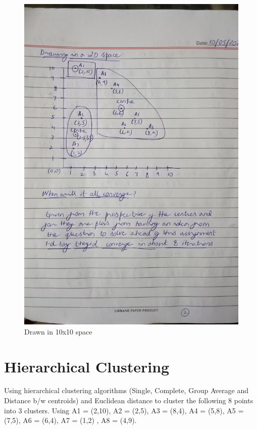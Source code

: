 \documentclass[12pt]{article}
\begin{document}
\begin{figure}
  \includegraphics[width=\linewidth]{2.jpg}
  \caption{Drawn in 10x10 space}
  \label{pic2}
\end{figure}

\clearpage

\section{Hierarchical Clustering}

Using hierarchical clustering algorithms (Single, Complete, Group Average and Distance b/w centroids) and Euclidean distance to cluster the following 8 points into 3 clusters. Using A1 = (2,10), A2 = (2,5), A3 = (8,4), A4 = (5,8), A5 = (7,5), A6 = (6,4), A7 = (1,2) , A8 = (4,9).
\end{document}
